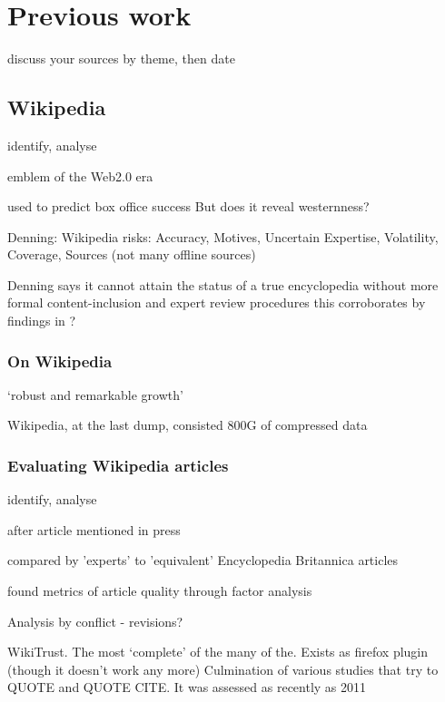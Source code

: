 \documentclass[a4paper,11pt,twoside,notitlepage]{article}
\begin{document}
        \section{Previous work}
        discuss your sources
        by theme, then date

        \subsection{Wikipedia}
        identify, analyse

        emblem of the Web2.0 era \cite{Mesgari2014}

        used to predict box office success \cite{Mestyan2012} But does
        it reveal westernness?

        Denning: Wikipedia risks: Accuracy, Motives, Uncertain Expertise,
        Volatility, Coverage, Sources (not many offline sources)
        \cite{Denning2005} 

        Denning says it cannot attain the status of a true
        encyclopedia without more formal content-inclusion and expert
        review procedures\cite{Denning2005} this corroborates by
        findings in \cite{Giles2005}?

        \subsubsection{On Wikipedia}
        `robust and remarkable growth'
        \cite{Kittur2007}\cite{Voss2005} 
        
        Wikipedia, at the last dump, consisted 800G of compressed data
        \cite{wiki-dump}

        \subsubsection{Evaluating Wikipedia articles}
        identify, analyse

        after article mentioned in press \cite{Lih2004}

        compared by 'experts' to 'equivalent' Encyclopedia Britannica articles \cite{Giles2005}

        found metrics of article quality through factor analysis
        \cite{Stvilia2005}

        Analysis by conflict - revisions?\cite{Kittur2007}

        WikiTrust. The most `complete' of the many of the. Exists as
        firefox plugin (though it doesn't work any more) Culmination
        of various studies that try to QUOTE \cite{Adler2007} and QUOTE CITE. It
        was assessed as recently as 2011 \cite{Lucassen2011}
       
\end{document}
